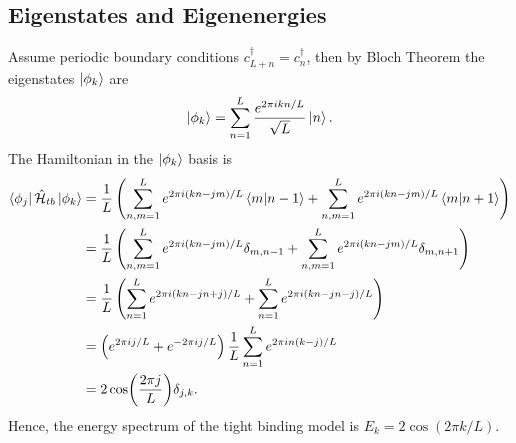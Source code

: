 \documentclass[12pt]{article}
\numberwithin{equation}{section}
\renewcommand{\H}{\mathcal{\hat{H}}}
\newcommand{\1}{\mathbb{1}}
\newcommand{\creation}{c^{\dagger}}
\newcommand{\tb}{\H_{tb}}
\begin{document}
\subsection{Eigenstates and Eigenenergies}
Assume periodic boundary conditions $\creation_{L+n}=\creation_{n}$, then by Bloch Theorem \cite{} the eigenstates $\ket{\phi_k}$ are 
\begin{equation}
    \ket{\phi_k}=\sum_{n=1}^L \frac{e^{2\pi i kn/L}}{\sqrt{L}}\ket{n}.
\end{equation}
The Hamiltonian in the $\ket{\phi_k}$ basis is
\begin{align}
    \bra{\phi_j}\tb\ket{\phi_k}&=\frac{1}{L}\left(
    \sum_{n,m=1}^Le^{ 2\pi i (kn-jm)/L} \braket{m}{n-1}+\sum_{n,m=1}^L e^{2\pi i(kn-jm)/L}\braket{m}{n+1}
    \right)
    \\
    &=\frac{1}{L}\left(
    \sum_{n,m=1}^Le^{2\pi i (kn-jm)/L} \delta_{m,n-1}+\sum_{n,m=1}^L e^{2\pi i(kn-jm)/L} \delta_{m,n+1}
    \right)
    \\
    &=\frac{1}{L}\left(
    \sum_{n=1}^L e^{2\pi i(kn-jn+j)/L} + \sum_{n=1}^L e^{2\pi i (kn-jn-j)/L}
    \right)
    \\
    &=\left(e^{2\pi i j/L}+e^{-2\pi ij/L}\right)\frac{1}{L}\sum_{n=1}^L e^{2\pi i n (k-j)/L}
    \\
    &=2 \cos (\frac{2 \pi j}{L}) \delta_{j,k}.
\end{align}
Hence, the energy spectrum of the tight binding model is $E_k=2\cos(2\pi k/L)$.
\end{document}
